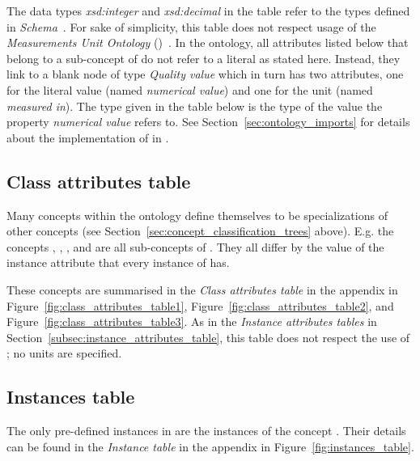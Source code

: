 The data types \emph{xsd:integer} and \emph{xsd:decimal} in the table refer to the types defined in \emph{ Schema}~\cite{xml-schema-datatypes}. For sake of simplicity, this table does not respect usage of the \emph{Measurements Unit Ontology} (\muo)~\cite{MUO}. In the ontology, all attributes listed below that belong to a sub-concept of  do not refer to a literal as stated here. Instead, they link to a blank node of type \emph{Quality value} which in turn has two attributes, one for the literal value (named \emph{numerical value}) and one for the unit (named \emph{measured in}). The type given in the table below is the type of the value the property \emph{numerical value} refers to. See Section~\ref{sec:ontology_imports} for details about the implementation of \muo in \smarthomeweather.

\subsection{Class attributes table}
\label{subsec:class_attributes_table}

Many concepts within the \smarthomeweather ontology define themselves to be specializations of other concepts (see Section~\ref{sec:concept_classification_trees} above). E.g. the concepts , , ,  and  are all sub-concepts of . They all differ by the value of the instance attribute  that every instance of  has.

These concepts are summarised in the \emph{Class attributes table} in the appendix in Figure~\ref{fig:class_attributes_table1}, Figure~\ref{fig:class_attributes_table2}, and Figure~\ref{fig:class_attributes_table3}. As in the \emph{Instance attributes tables} in Section~\ref{subsec:instance_attributes_table}, this table does not respect the use of \muo; no units are specified.

\subsection{Instances table}
\label{subsec:instances_table}

The only pre-defined instances in \smarthomeweather are the instances of the concept . Their details can be found in the \emph{Instance table} in the appendix in Figure~\ref{fig:instances_table}.

